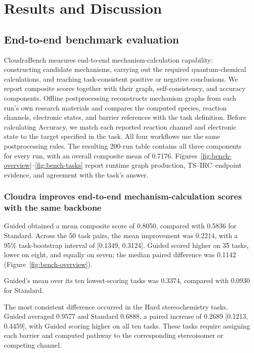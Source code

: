 \section{Results and Discussion}




\subsection{End-to-end benchmark evaluation}

CloudraBench measures end-to-end mechanism-calculation capability: constructing candidate mechanisms, carrying out the required quantum-chemical calculations, and reaching task-consistent positive or negative conclusions. We report composite scores together with their graph, self-consistency, and accuracy components. Offline postprocessing reconstructs mechanism graphs from each run's own research materials and compares the computed species, reaction channels, electronic states, and barrier references with the task definition. Before calculating Accuracy, we match each reported reaction channel and electronic state to the target specified in the task. All four workflows use the same postprocessing rules. The resulting 200-run table contains all three components for every run, with an overall composite mean of 0.7176. Figures~\ref{fig:bench-overview}--\ref{fig:bench-tasks} report runtime graph production, TS--IRC--endpoint evidence, and agreement with the task's answer.

\subsubsection{Cloudra improves end-to-end mechanism-calculation scores with the same backbone}

Guided obtained a mean composite score of 0.8050, compared with 0.5836 for Standard. Across the 50 task pairs, the mean improvement was 0.2214, with a 95\% task-bootstrap interval of [0.1349, 0.3124]. Guided scored higher on 35 tasks, lower on eight, and equally on seven; the median paired difference was 0.1142 (Figure~\ref{fig:bench-overview}).

Guided's mean over its ten lowest-scoring tasks was 0.3374, compared with 0.0930 for Standard.

The most consistent difference occurred in the Hard stereochemistry tasks. Guided averaged 0.9577 and Standard 0.6888, a paired increase of 0.2689 [0.1213, 0.4459], with Guided scoring higher on all ten tasks. These tasks require assigning each barrier and computed pathway to the corresponding stereoisomer or competing channel.

